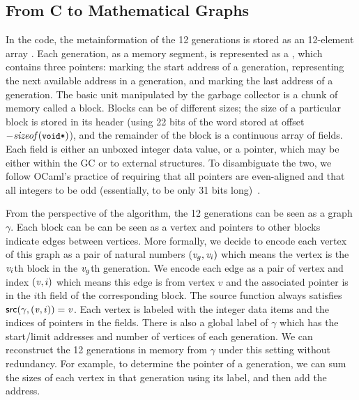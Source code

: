 \subsection{From C to Mathematical Graphs}
\label{sec:movetomathgraph}
In the code, the metainformation of the 12 generations is stored as an
12-element array . Each generation, as a memory segment,
is represented as a  , which contains
three pointers:  marking the start address of a
generation,  representing the next available address in a
generation, and  marking the last address of a
generation. The basic unit manipulated by the garbage collector is a
chunk of memory called a block. Blocks can be of different sizes;
the size of a particular block is stored in its
header (using 22 bits of the word stored at offset $-\m{sizeof}(\code{void*})$), and the remainder of the block is a continuous array of fields. 
Each field is either an unboxed integer data value, or a pointer, which may be
either within the GC or to external structures.  To disambiguate the two,
we follow OCaml's practice of requiring that all pointers are even-aligned and 
that all integers to be odd (essentially, to be only 31 bits long)~\cite{realworldocaml}.

From the perspective of the algorithm, the 12 generations can be seen
as a graph $\gamma$. Each block can be can be seen as a
vertex and pointers to other blocks indicate edges between 
vertices. More formally, we decide to encode each vertex of this graph
as a pair of natural numbers $(\mathit{v}_g, \mathit{v}_i)$ which means the vertex is
the $\mathit{v}_i$th block in the $\mathit{v}_g$th generation. We encode each edge
as a pair of vertex and index $(\mathit{v}, i)$ which means this edge is from
vertex $v$ and the associated pointer is in the $i$th field of the
corresponding block.  The source function always satisfies
$\mathsf{src}(\gamma, (\mathit{v}, i)) = \mathit{v}$.
Each vertex is labeled with the integer data items and the indices of pointers in the
fields. There is also a global label of $\gamma$ which has the
start/limit addresses and number of vertices of each generation. We
can reconstruct the 12 generations in memory from $\gamma$ under this
setting without redundancy. For example, to determine the  pointer of
a generation, we can sum the sizes of each vertex in that generation using its label,
and then add the  address.

